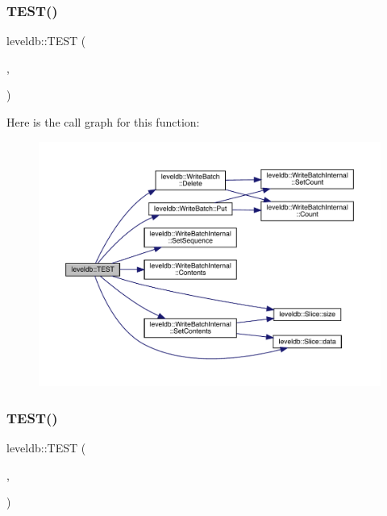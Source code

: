 \mbox{\label{namespaceleveldb_a8021231dcd7fd48d082ecf965a2b8230}} 
\subsubsection{\texorpdfstring{TEST()}{TEST()}\hspace{0.1cm}{\footnotesize\ttfamily [11/102]}}
{\footnotesize\ttfamily leveldb\+::\+T\+E\+ST (\begin{DoxyParamCaption}\item[{\mbox{\hyperlink{classleveldb_1_1_write_batch_test}{Write\+Batch\+Test}}}]{,  }\item[{Corruption}]{ }\end{DoxyParamCaption})}

Here is the call graph for this function\+:
\nopagebreak
\begin{figure}[H]
\begin{center}
\leavevmode
\includegraphics[width=350pt]{namespaceleveldb_a8021231dcd7fd48d082ecf965a2b8230_cgraph}
\end{center}
\end{figure}
\mbox{\label{namespaceleveldb_ac77b62bf86349926d23431e4c1c9034a}} 
\subsubsection{\texorpdfstring{TEST()}{TEST()}\hspace{0.1cm}{\footnotesize\ttfamily [12/102]}}
{\footnotesize\ttfamily leveldb\+::\+T\+E\+ST (\begin{DoxyParamCaption}\item[{\mbox{\hyperlink{classleveldb_1_1_file_name_test}{File\+Name\+Test}}}]{,  }\item[{Construction}]{ }\end{DoxyParamCaption})}

